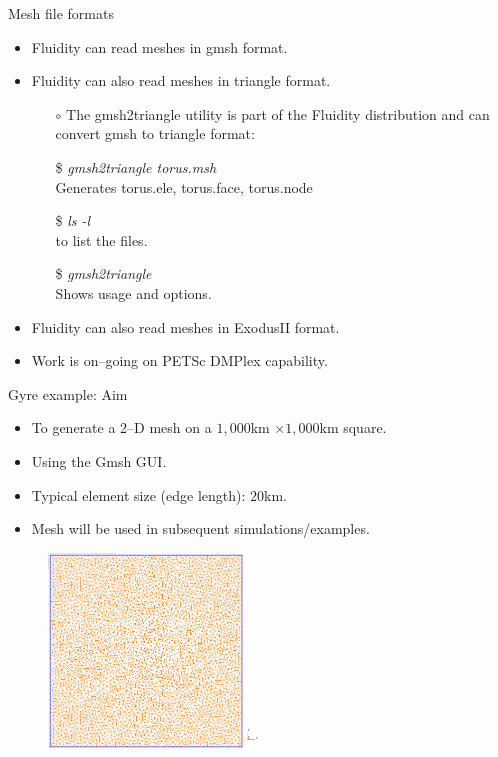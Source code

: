 \documentclass[t]{beamer}
\begin{document}
\begin{frame}{Mesh file formats}
   \begin{itemize}
      \item Fluidity can read meshes in gmsh format.\vspace{10pt}
      \item Fluidity can also read meshes in triangle format.
      \begin{itemize}
         \item[$\circ$] The gmsh2triangle utility is part of the Fluidity distribution and can convert gmsh to triangle format:
         \item[\$] \emph{gmsh2triangle torus.msh} \\ \hspace{10pt} Generates torus.ele, torus.face, torus.node
         \item[\$] \emph{ls -l} \\ \hspace{10pt} to list the files.
         \item[\$] \emph{gmsh2triangle} \\ \hspace{10pt} Shows usage and options.\vspace{10pt}
      \end{itemize}
      \item Fluidity can also read meshes in ExodusII format.\vspace{10pt}
      \item Work is on--going on PETSc DMPlex capability.
   \end{itemize}
\end{frame}

\begin{frame}{Gyre example: Aim}

\begin{itemize}
    \item To generate a 2--D mesh on a $1,000$km $\times 1,000$km square.
    \item Using the Gmsh GUI.
    \item Typical element size (edge length): $20$km.
    \item Mesh will be used in subsequent simulations/examples.
\end{itemize}

\begin{figure}[htbp]
 \centering
  \includegraphics[width=0.5\textwidth]{figures/2d-example-mesh}
\end{figure}

\end{frame}
\end{document}
